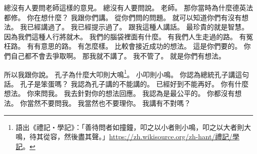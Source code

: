 \hypertarget{w01:cue:3541}{}總沒有人要問老師這樣的意見。
\hypertarget{w01:cue:3542}{}總沒有人要問說。
\hypertarget{w01:cue:3543}{}老師。
\hypertarget{w01:cue:3544}{}那你當時為什麼德英法都修。
\hypertarget{w01:cue:3545}{}你在想什麼？
\hypertarget{w01:cue:3546}{}我跟你們講。
\hypertarget{w01:cue:3547}{}從你們問的問題。
\hypertarget{w01:cue:3548}{}就可以知道你們有沒有想法。
\hypertarget{w01:cue:3549}{}我已經講過了。
\hypertarget{w01:cue:3550}{}我已經提示過了。
\hypertarget{w01:cue:3551}{}跟我這種人講話。
\hypertarget{w01:cue:3552}{}最珍貴的就是智慧。
\hypertarget{w01:cue:3553}{}因為我們這種人行將就木。
\hypertarget{w01:cue:3554}{}我們的腦袋裡面有什麼。
\hypertarget{w01:cue:3555}{}有我們人生走過的路。
\hypertarget{w01:cue:3556}{}有冤枉路。
\hypertarget{w01:cue:3557}{}有有意思的路。
\hypertarget{w01:cue:3558}{}有怎麼樣。
\hypertarget{w01:cue:3559}{}比較會接近成功的想法。
\hypertarget{w01:cue:3560}{}這是你們要的。
\hypertarget{w01:cue:3561}{}你們自己都不會去爭取啊。
\hypertarget{w01:cue:3562}{}那我就不講了。
\hypertarget{w01:cue:3563}{}我不管了。
\hypertarget{w01:cue:3564}{}就是你們有想法。

\hypertarget{w01:cue:3565}{}所以我跟你說。
\hypertarget{w01:cue:3566}{}孔子為什麼大叩則大鳴\footnote{語出《禮記・學記》：「善待問者如撞鐘，叩之以小者則小鳴，叩之以大者則大鳴，待其從容，然後盡其聲。」\href{https://zh.wikisource.org/zh-hant/\%E7\%A6\%AE\%E8\%A8\%98/\%E5\%AD\%B8\%E8\%A8\%98}{https://zh.wikisource.org/zh-hant/禮記/學記}。}。
\hypertarget{w01:cue:3567}{}小叩則小鳴。
\hypertarget{w01:cue:3568}{}你認為總統孔子講這句話。
\hypertarget{w01:cue:3569}{}孔子是笨蛋嗎？
\hypertarget{w01:cue:3570}{}我認為孔子講的不能講的。
\hypertarget{w01:cue:3571}{}已經好到不能再好。
\hypertarget{w01:cue:3572}{}你有什麼想法。
\hypertarget{w01:cue:3573}{}你來問我。
\hypertarget{w01:cue:3574}{}我去針對你的想法回應。
\hypertarget{w01:cue:3575}{}我認為是最公平的。
\hypertarget{w01:cue:3576}{}你都沒有想法。
\hypertarget{w01:cue:3577}{}你當然不要問我。
\hypertarget{w01:cue:3578}{}我當然也不要理你。
\hypertarget{w01:cue:3579}{}我講有不對嗎？

